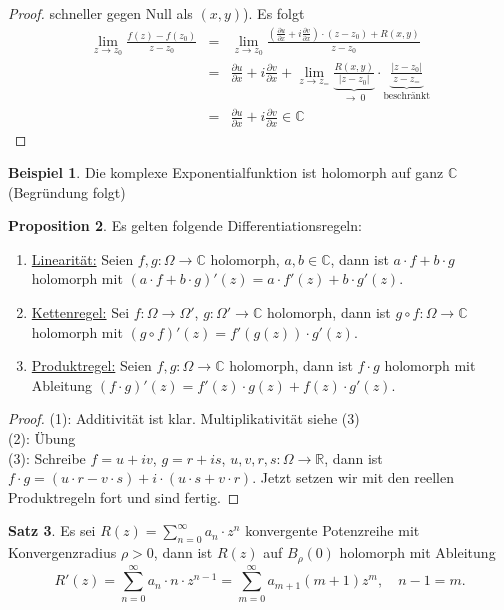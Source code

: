 \documentclass[11pt,titlepage]{article}
\theoremstyle{definition}
\newtheorem{theorem}{Satz}[section]
\newtheorem{proposition}[theorem]{Proposition}
\newtheorem{example}[theorem]{Beispiel}
\theoremstyle{remark}
\begin{document}
\begin{proof}
		schneller gegen Null als $(x,y)$). Es folgt 
		\begin{eqnarray*}
			\lim_{z\to z_0}\frac{f(z)-f(z_0)}{z-z_0} &=& \lim_{z\to z_0}\frac{\left(\frac{\partial u}{\partial x}
			+i\frac{\partial v}{\partial x}\right)\cdot (z-z_0)+R(x,y)}{z-z_0} \\
			&=&\frac{\partial u}{\partial x}+i\frac{\partial v}{\partial x} +\lim_{z\to z_=}
			\underbrace{\frac{R(x,y)}{|z-z_0|}}_{\to\  0}\cdot \underbrace{\frac{|z-z_0|}{z-z_=}}_{\text{
			beschränkt}}\\
			&=& \frac{\partial u}{\partial x}+i\frac{\partial v}{\partial x} \in\mathbb{C}
		\end{eqnarray*}
	\end{proof}
	
	\begin{example}
		Die komplexe Exponentialfunktion ist holomorph auf ganz $\mathbb{C}$ (Begründung folgt)
	\end{example}
	
	\begin{proposition}
		Es gelten folgende Differentiationsregeln:
		\begin{enumerate}
			\item \underline{Linearität:} Seien $f,g:\Omega\to\mathbb{C}$ holomorph, $a,b\in\mathbb{C}
			$, dann ist $a\cdot f+b\cdot g$ holomorph mit $(a\cdot f+b\cdot g)'(z)=a\cdot f'(z)+b\cdot 
			g'(z)$.
			\item \underline{Kettenregel:} Sei $f:\Omega\to\Omega'$, $g:\Omega'\to\mathbb{C}$ 
			holomorph, dann ist $g\circ f:\Omega\to\mathbb{C}$ holomorph mit 
			$(g\circ f)'(z)=f'(g(z))\cdot g'(z)$.
			\item \underline{Produktregel:} Seien $f,g:\Omega\to\mathbb{C}$ holomorph, dann ist 
			$f\cdot g$ holomorph mit Ableitung $(f\cdot g)'(z)= f'(z)\cdot g(z)+f(z)\cdot g'(z)$.
		\end{enumerate}
	\end{proposition}
	
	\begin{proof}
		(1): Additivität ist klar. Multiplikativität siehe (3) \\
		(2): Übung\\
		(3): Schreibe $f=u+iv$, $g=r+is$, $u,v,r,s:\Omega\to\mathbb{R}$, dann ist 
		$f\cdot g=(u\cdot r-v\cdot s)+i\cdot(u\cdot s+v\cdot r)$. Jetzt setzen wir mit den reellen 
		Produktregeln fort und sind fertig.
	\end{proof}
	
	\begin{theorem}
		Es sei $R(z)=\sum_{n=0}^{\infty} a_n \cdot z^n $ konvergente Potenzreihe mit 
		Konvergenzradius $\rho >0$, dann ist $R(z)$ auf $B_{\rho}(0)$ holomorph mit Ableitung 
		\[R'(z)=\sum_{n=0}^{\infty} a_n \cdot n\cdot z^{n-1} =\sum_{m=0}^{\infty}a_{m+1}(m+1)z^m,\quad
		n-1=m.\]
	\end{theorem}
	
\end{document}
